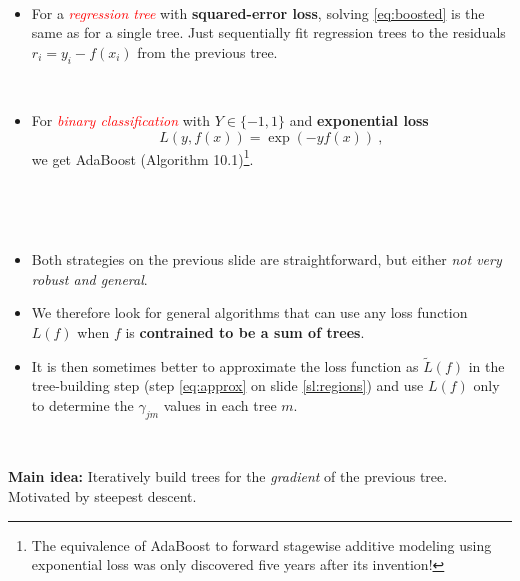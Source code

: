 \documentclass[
  10pt,
  ignorenonframetext,
]{beamer}
\providecommand{\tightlist}{%
  \setlength{\itemsep}{0pt}\setlength{\parskip}{0pt}}
\begin{document}
\begin{frame}
\(~\)

\begin{itemize}
\tightlist
\item
  For a \emph{\textcolor{red}{regression tree}} with
  \textbf{squared-error loss}, solving \eqref{eq:boosted} is the same as
  for a single tree. Just sequentially fit regression trees to the
  residuals \(r_i = y_i - f(x_i)\) from the previous tree.
\end{itemize}

\(~\)

\begin{itemize}
\tightlist
\item
  For \emph{\textcolor{red}{binary classification}} with
  \(Y\in \{-1,1\}\) and \textbf{exponential loss}
  \[L(y,f(x))=\exp(-yf(x)) \ ,\] we get AdaBoost (Algorithm
  10.1)\footnote{The equivalence of AdaBoost to forward stagewise additive modeling using exponential loss was only discovered five years after its invention!}.
\end{itemize}

\(~\)
\end{frame}

\begin{frame}
\(~\)

\begin{itemize}
\tightlist
\item
  Both strategies on the previous slide are straightforward, but either
  \emph{not very robust and general}.
\end{itemize}

\vspace{2mm}

\begin{itemize}
\tightlist
\item
  We therefore look for general algorithms that can use any loss
  function \(L(f)\) when \(f\) is \textbf{contrained to be a sum of
  trees}.
\end{itemize}

\vspace{2mm}

\begin{itemize}
\tightlist
\item
  It is then sometimes better to approximate the loss function as
  \(\tilde{L}(f)\) in the tree-building step (step \eqref{eq:approx} on
  slide \ref{sl:regions}) and use \(L(f)\) only to determine the
  \(\gamma_{jm}\) values in each tree \(m\).
\end{itemize}

\(~\)

\textbf{Main idea:} Iteratively build trees for the \emph{gradient} of
the previous tree. Motivated by steepest descent.
\end{frame}
\end{document}
